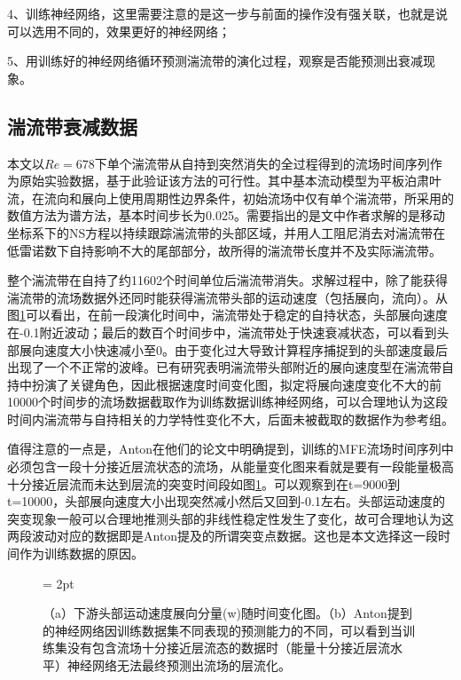 4、训练神经网络，这里需要注意的是这一步与前面的操作没有强关联，也就是说可以选用不同的，效果更好的神经网络；

5、用训练好的神经网络循环预测湍流带的演化过程，观察是否能预测出衰减现象。

\subsection{湍流带衰减数据}
本文以$Re = 678$下单个湍流带从自持到突然消失的全过程得到的流场时间序列作为原始实验数据，基于此验证该方法的可行性。其中基本流动模型为平板泊肃叶流，在流向和展向上使用周期性边界条件，初始流场中仅有单个湍流带，所采用的数值方法为谱方法\cite{xu_song_2022}，基本时间步长为0.025。需要指出的是文中作者求解的是移动坐标系下的NS方程以持续跟踪湍流带的头部区域，并用人工阻尼消去对湍流带在低雷诺数下自持影响不大的尾部部分，故所得的湍流带长度并不及实际湍流带。

整个湍流带在自持了约11602个时间单位后湍流带消失。求解过程中，除了能获得湍流带的流场数据外还同时能获得湍流带头部的运动速度（包括展向，流向）。从图\ref{fig:head_speed}可以看出，在前一段演化时间中，湍流带处于稳定的自持状态，头部展向速度在-0.1附近波动；最后的数百个时间步中，湍流带处于快速衰减状态，可以看到头部展向速度大小快速减小至0。由于变化过大导致计算程序捕捉到的头部速度最后出现了一个不正常的波峰。已有研究表明湍流带头部附近的展向速度型在湍流带自持中扮演了关键角色，因此根据速度时间变化图，拟定将展向速度变化不大的前10000个时间步的流场数据截取作为训练数据训练神经网络，可以合理地认为这段时间内湍流带与自持相关的力学特性变化不大，后面未被截取的数据作为参考组。

值得注意的一点是，Anton在他们的论文中明确提到，训练的MFE流场时间序列中必须包含一段十分接近层流状态的流场，从能量变化图来看就是要有一段能量极高十分接近层流而未达到层流的突变时间段如图\ref{fig:head_speed}。可以观察到在t=9000到t=10000，头部展向速度大小出现突然减小然后又回到-0.1左右。头部运动速度的突变现象一般可以合理地推测头部的非线性稳定性发生了变化，故可合理地认为这两段波动对应的数据即是Anton提及的所谓突变点数据。这也是本文选择这一段时间作为训练数据的原因。
\begin{figure}[H]
	\subfigbottomskip = 2pt
	\begin{minipage}[h]{\linewidth}
	\centering
	\end{minipage}
	\quad
	\begin{minipage}[h]{\linewidth}
	\centering
	\end{minipage}
	\quad
	\caption{（a）下游头部运动速度展向分量(w)随时间变化图。（b）Anton提到的神经网络因训练数据集不同表现的预测能力的不同，可以看到当训练集没有包含流场十分接近层流态的数据时（能量十分接近层流水平）神经网络无法最终预测出流场的层流化。}
\label{fig:head_speed}
\end{figure}

